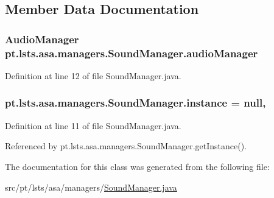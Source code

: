 \subsection{Member Data Documentation}
\hypertarget{classpt_1_1lsts_1_1asa_1_1managers_1_1SoundManager_adb83fab9065c3c13209bff3a97f19b06}{}
\subsubsection[{audio\+Manager}]{\setlength{\rightskip}{0pt plus 5cm}Audio\+Manager pt.\+lsts.\+asa.\+managers.\+Sound\+Manager.\+audio\+Manager\hspace{0.3cm}{\ttfamily [private]}}\label{classpt_1_1lsts_1_1asa_1_1managers_1_1SoundManager_adb83fab9065c3c13209bff3a97f19b06}


Definition at line 12 of file Sound\+Manager.\+java.

\hypertarget{classpt_1_1lsts_1_1asa_1_1managers_1_1SoundManager_a4a26855c28972077213590f9194aa939}{}
\subsubsection[{instance}]{ pt.\+lsts.\+asa.\+managers.\+Sound\+Manager.\+instance = null\hspace{0.3cm}{\ttfamily [static]}, {\ttfamily [private]}}\label{classpt_1_1lsts_1_1asa_1_1managers_1_1SoundManager_a4a26855c28972077213590f9194aa939}


Definition at line 11 of file Sound\+Manager.\+java.



Referenced by pt.\+lsts.\+asa.\+managers.\+Sound\+Manager.\+get\+Instance().



The documentation for this class was generated from the following file\+:\begin{DoxyCompactItemize}
\item 
src/pt/lsts/asa/managers/\hyperlink{SoundManager_8java}{Sound\+Manager.\+java}\end{DoxyCompactItemize}
